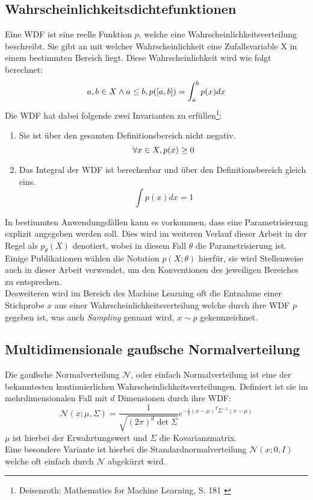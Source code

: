 \subsection{Wahrscheinlichkeitsdichtefunktionen}
Eine \ac{WDF} ist eine reelle Funktion $p$, welche eine Wahrscheinlichkeitsverteilung beschreibt. Sie gibt an mit welcher Wahrscheinlichkeit eine Zufallsvariable X in einem bestimmten Bereich liegt. Diese Wahrscheinlichkeit wird wie folgt berechnet:
\begin{equation}
    a,b \in X \land a \le b, \space p([a, b]) = \int_a^b p(x) dx
\end{equation}
Die \ac{WDF} hat dabei folgende zwei Invarianten zu erfüllen\footnote{
    Deisenroth: Mathematics for Machine Learning, S. 181
    \cite{Deisenroth2020}
}:
\begin{enumerate}
    \item Sie ist über den gesamten Definitionsbereich nicht negativ. 
    \begin{equation}
        \forall x \in X, \space p(x) \ge 0
    \end{equation}
    \item Das Integral der \ac{WDF} ist berechenbar und über den Definitionsbereich gleich eins.
    \begin{equation}
        \int p(x) dx = 1
    \end{equation}
\end{enumerate}
In bestimmten Anwendungsfällen kann es vorkommen, dass eine Parametrisierung explizit angegeben werden soll. Dies wird im weiteren Verlauf dieser Arbeit in der Regel als $p_\theta(X)$ denotiert, wobei in diesem Fall $\theta$ die Parametrisierung ist. Einige Publikationen wählen die Notation $p(X; \theta)$ hierfür, sie wird Stellenweise auch in dieser Arbeit verwendet, um den Konventionen des jeweiligen Bereiches zu entsprechen. \\
Desweiteren wird im Bereich des Machine Learning oft die Entnahme einer Stichprobe $x$ aus einer Wahrscheinlichkeitsverteilung welche durch ihre \ac{WDF} $p$ gegeben ist, was auch \textit{Sampling} gennant wird, $x \sim p$ gekennzeichnet. 


\subsection{Multidimensionale gaußsche Normalverteilung}

Die gaußsche Normalverteilung $\mathcal N$, oder einfach Normalverteilung ist eine der bekanntesten kontinuierlichen Wahrscheinlichkeitsverteilungen. Definiert ist sie im mehrdimensionalen Fall mit $d$ Dimensionen durch ihre \ac{WDF}:
\begin{equation}
    \mathcal N(x; \mu, \Sigma) = 
    \frac{1}{\sqrt{(2\pi)^d \det{\Sigma}}}
    e^{-\frac{1}{2}(x-\mu)^T \Sigma^{-1} (x-\mu)}
\end{equation}
$\mu$ ist hierbei der Erwahrtungswert und $\Sigma$ die Kovarianzmatrix. \\
Eine besondere Variante ist hierbei die Standardnormalverteilung $\mathcal N(x; 0, I)$ welche oft einfach durch $\mathcal N$ abgekürzt wird.

